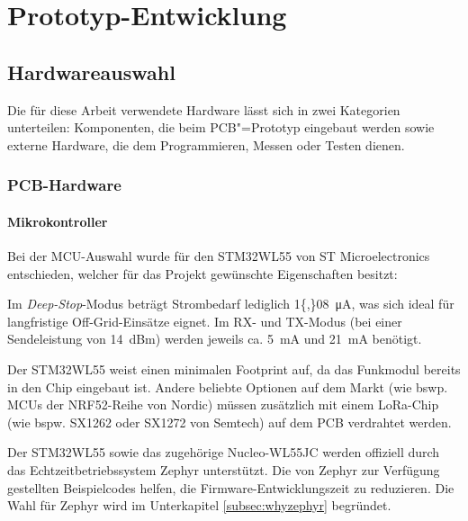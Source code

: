
\chapter{Prototyp-Entwicklung}
\label{chap:prot}
 
\section{Hardwareauswahl}
\label{sec:hardwareauswahl}

Die für diese Arbeit verwendete Hardware lässt sich in zwei Kategorien
unterteilen: Komponenten, die beim PCB"=Prototyp eingebaut werden
sowie externe Hardware, die dem Programmieren, Messen oder Testen dienen. 

\subsection{PCB-Hardware} %

\subsubsection{Mikrokontroller}

Bei der MCU-Auswahl wurde für den STM32WL55 von ST Microelectronics entschieden, welcher für das Projekt gewünschte 
Eigenschaften besitzt:

\begin{description}[leftmargin=*, widest=\textbf{Niedriger Energieverbrauch:}, nosep]
    \item[Niedriger Energieverbrauch:] 
        Im \emph{Deep-Stop}-Modus beträgt Strombedarf lediglich \qty{1{,}08}{\micro\ampere}, 
        was sich ideal für langfristige Off-Grid-Einsätze eignet. 
        Im RX- und TX-Modus (bei einer Sendeleistung von \qty{14}{dBm}) werden jeweils ca. \qty{5}{mA} und \qty{21}{mA} benötigt.
    \item[Kleiner Footprint:] 
        Der STM32WL55 weist einen minimalen Footprint auf, da das Funkmodul bereits in den Chip eingebaut ist. Andere 
        beliebte Optionen auf dem Markt (wie bswp. MCUs der NRF52-Reihe von Nordic) müssen zusätzlich mit einem
        LoRa-Chip (wie bspw. SX1262 oder SX1272 von Semtech) auf dem PCB verdrahtet werden.
    \item[Zephyr-Unterstützung:] 
        Der STM32WL55 sowie das zugehörige Nucleo-WL55JC werden offiziell durch das Echtzeitbetriebssystem 
        Zephyr unterstützt. Die von Zephyr zur Verfügung gestellten Beispielcodes helfen, die Firmware-Entwicklungszeit
        zu reduzieren. Die Wahl für Zephyr wird im Unterkapitel \ref{subsec:whyzephyr} begründet. 
\end{description}

